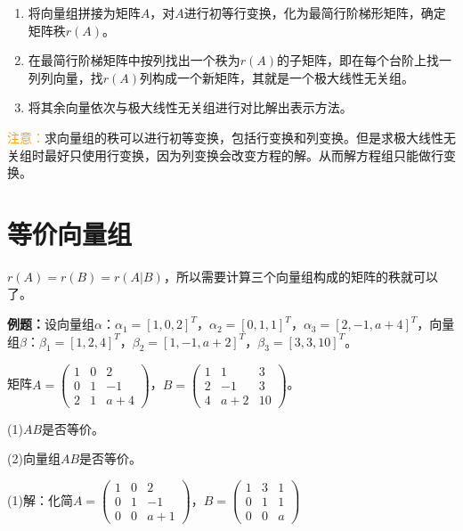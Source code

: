 \documentclass[UTF8, 12pt]{ctexart}
\begin{document}
\begin{enumerate}
    \item 将向量组拼接为矩阵$A$，对$A$进行初等行变换，化为最简行阶梯形矩阵，确定矩阵秩$r(A)$。
    \item 在最简行阶梯矩阵中按列找出一个秩为$r(A)$的子矩阵，即在每个台阶上找一列列向量，找$r(A)$列构成一个新矩阵，其就是一个极大线性无关组。
    \item 将其余向量依次与极大线性无关组进行对比解出表示方法。
\end{enumerate}

\textcolor{orange}{注意：}求向量组的秩可以进行初等变换，包括行变换和列变换。但是求极大线性无关组时最好只使用行变换，因为列变换会改变方程的解。从而解方程组只能做行变换。

\section{等价向量组}

$r(A)=r(B)=r(A|B)$，所以需要计算三个向量组构成的矩阵的秩就可以了。

\textbf{例题：}设向量组$\alpha$：$\alpha_1=[1,0,2]^T$，$\alpha_2=[0,1,1]^T$，$\alpha_3=[2,-1,a+4]^T$，向量组$\beta$：$\beta_1=[1,2,4]^T$，$\beta_2=[1,-1,a+2]^T$，$\beta_3=[3,3,10]^T$。

矩阵$A=\left(\begin{array}{ccc}
    1 & 0 & 2 \\
    0 & 1 & -1 \\
    2 & 1 & a+4
\end{array}\right)$，$B=\left(\begin{array}{ccc}
    1 & 1 & 3 \\
    2 & -1 & 3 \\
    4 & a+2 & 10
\end{array}\right)$。\medskip

(1)$AB$是否等价。

(2)向量组$AB$是否等价。

(1)解：化简$A=\left(\begin{array}{ccc}
    1 & 0 & 2 \\
    0 & 1 & -1 \\
    0 & 0 & a+1
\end{array}\right)$，$B=\left(\begin{array}{ccc}
    1 & 3 & 1 \\
    0 & 1 & 1 \\
    0 & 0 & a
\end{array}\right)$
\end{document}
